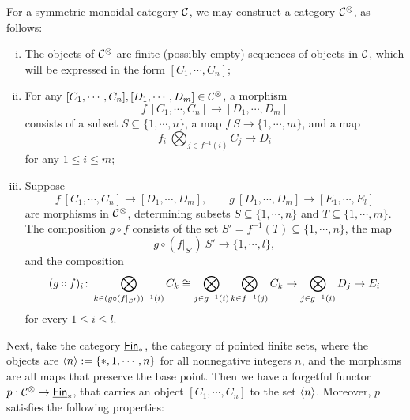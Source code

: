 \documentclass[twoside]{article}
\begin{document}
\begin{construction}
    For a symmetric monoidal category $\cal C$, we may construct a 
    category $\cal C^\otimes$, as follows:

    \begin{enumerate}[i)]
        \item The objects of $\cal C^\otimes$ are finite (possibly empty) sequences
        of objects in $\cal C$, which will be expressed in the form $[C_1,\cdots,C_n]$;

        \item For any $[C_1,\cdots,C_n],[D_1,\cdots,D_m]\in\cal C^\otimes$, a morphism
        \[f\:[C_1,\cdots,C_n]\to[D_1,\cdots,D_m]\] consists of a subset 
        $S\subseteq\{1,\cdots,n\}$, a map $f\:S\to\{1,\cdots,m\}$, and a map 
        \[f_i\:\bigotimes_{j\in f^{-1}(i)}C_j\to D_i\] for any $1\le i\le m$;

        \item Suppose \[f\:[C_1,\cdots,C_n]\to[D_1,\cdots,D_m],\hspace{2em}
        g\:[D_1,\cdots,D_m]\to[E_1,\cdots,E_l]\] are morphisms in $\cal C^\otimes$,
        determining subsets $S\subseteq\{1,\cdots,n\}$ and $T\subseteq\{1,\cdots,m\}$.
        The composition $g\circ f$ consists of the set 
        $S'=f^{-1}(T)\subseteq\{1,\cdots,n\}$, the map \[g\circ(f|_{S'})\:
        S'\to\{1,\cdots,l\},\] and the composition \[(g\circ f)_{i}\colon
        \bigotimes\limits_{k\in(g\circ(f|_{S'}))^{-1}(i)}C_k\cong\bigotimes\limits_{j\in g^{-1}(i)}
        \bigotimes\limits_{k\in f^{-1}(j)}C_k\to\bigotimes\limits_{j\in g^{-1}(i)}D_j\to E_i\] for every
        $1\le i\le l$.
    \end{enumerate}
\end{construction}

Next, take the category $\underline{\smash{\mathsf{Fin}}}_*$, the category of pointed finite sets,
where the objects are $\left<n\right>:=\{*,1,\cdots,n\}$ for all
nonnegative integers $n$, and the morphisms are all maps that preserve the base point.
Then we have a forgetful functor 
$p:\cal C^\otimes\to\underline{\smash{\mathsf{Fin}}}_*$, that carries an object $[C_1,\cdots,C_n]$ to the set
$\left<n\right>$. Moreover, $p$ satisfies the following properties:
\end{document}
